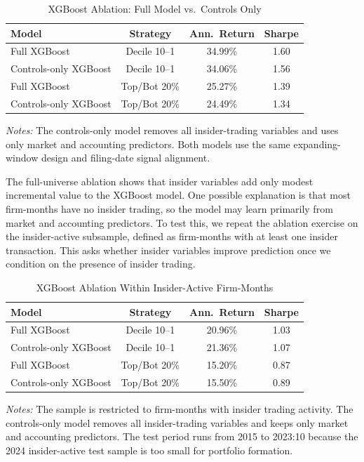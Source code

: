 \documentclass{article}
\begin{document}
\begin{table}[h!]
\centering
\caption{XGBoost Ablation: Full Model vs.\ Controls Only}
\label{tab:xgb_ablation}
\small
\begin{tabular}{lccc}
\toprule
Model & Strategy & Ann.\ Return & Sharpe \\
\midrule
Full XGBoost & Decile 10--1 & 34.99\% & 1.60 \\
Controls-only XGBoost & Decile 10--1 & 34.06\% & 1.56 \\
Full XGBoost & Top/Bot 20\% & 25.27\% & 1.39 \\
Controls-only XGBoost & Top/Bot 20\% & 24.49\% & 1.34 \\
\bottomrule
\end{tabular}
\begin{minipage}{\linewidth}
\vspace{2pt}
\small\textit{Notes:} The controls-only model removes all insider-trading variables and uses only market and accounting predictors. Both models use the same expanding-window design and filing-date signal alignment.
\end{minipage}
\end{table}

The full-universe ablation shows that insider variables add only modest incremental value to the XGBoost model. One possible explanation is that most firm-months have no insider trading, so the model may learn primarily from market and accounting predictors. To test this, we repeat the ablation exercise on the insider-active subsample, defined as firm-months with at least one insider transaction. This asks whether insider variables improve prediction once we condition on the presence of insider trading.

\begin{table}[h!]
\centering
\caption{XGBoost Ablation Within Insider-Active Firm-Months}
\label{tab:xgb_insider_active}
\small
\begin{tabular}{lccc}
\toprule
Model & Strategy & Ann.\ Return & Sharpe \\
\midrule
Full XGBoost & Decile 10--1 & 20.96\% & 1.03 \\
Controls-only XGBoost & Decile 10--1 & 21.36\% & 1.07 \\
Full XGBoost & Top/Bot 20\% & 15.20\% & 0.87 \\
Controls-only XGBoost & Top/Bot 20\% & 15.50\% & 0.89 \\
\bottomrule
\end{tabular}
\begin{minipage}{\linewidth}
\vspace{2pt}
\small\textit{Notes:} The sample is restricted to firm-months with insider trading activity. The controls-only model removes all insider-trading variables and keeps only market and accounting predictors. The test period runs from 2015 to 2023:10 because the 2024 insider-active test sample is too small for portfolio formation.
\end{minipage}
\end{table}
\end{document}
